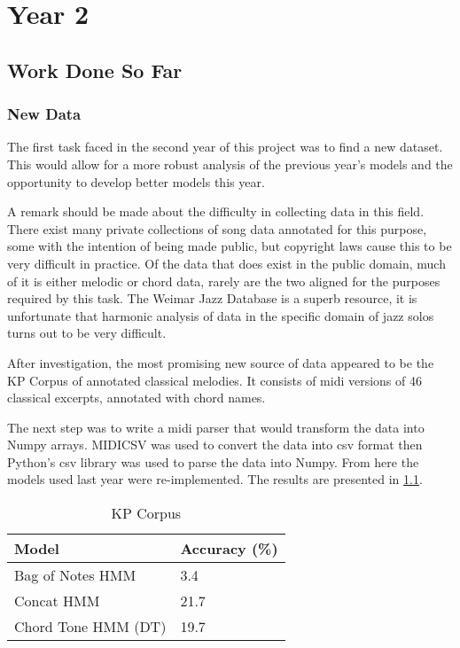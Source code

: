 \documentclass[bsc,singlespacing,logo, parskip, deptreport]{infthesis}
\begin{document}
\chapter{Year 2}

\section{Work Done So Far}
\subsection{New Data}
The first task faced in the second year of this project was to find a new dataset. This would allow for a more robust analysis of the previous year's models and the opportunity to develop better models this year.

A remark should be made about the difficulty in collecting data in this field. There exist many private collections of song data annotated for this purpose, some with the intention of being made public, but copyright laws cause this to be very difficult in practice. Of the data that does exist in the public domain, much of it is either melodic or chord data, rarely are the two aligned for the purposes required by this task. The Weimar Jazz Database is a superb resource, it is unfortunate that harmonic analysis of data in the specific domain of jazz solos turns out to be very difficult.

After investigation, the most promising new source of data appeared to be the KP Corpus of annotated classical melodies. It consists of midi versions of 46 classical excerpts, annotated with chord names.

The next step was to write a midi parser that would transform the data into Numpy arrays. MIDICSV was used to convert the data into csv format then Python's csv library was used to parse the data into Numpy. From here the models used last year were re-implemented. The results are presented in \ref{kp}.

\begin{table}
\centering
\caption{KP Corpus}
\label{kp}
\begin{tabular}{l|l}
Model               & Accuracy (\%) \\ \hline
Bag of Notes HMM    & 3.4           \\
Concat HMM          & 21.7          \\
Chord Tone HMM (DT) & 19.7          \\
\end{tabular}
\end{table} 
\end{document}
